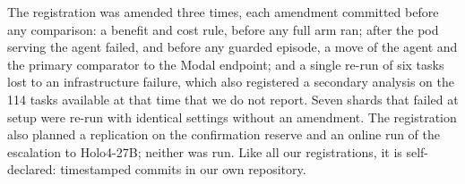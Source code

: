 The registration was amended three times, each amendment committed before any comparison: a benefit and cost rule, before any full arm ran; after the pod serving the agent failed, and before any guarded episode, a move of the agent and the primary comparator to the Modal endpoint; and a single re-run of six tasks lost to an infrastructure failure, which also registered a secondary analysis on the 114 tasks available at that time that we do not report. Seven shards that failed at setup were re-run with identical settings without an amendment. The registration also planned a replication on the confirmation reserve and an online run of the escalation to Holo4-27B; neither was run. Like all our registrations, it is self-declared: timestamped commits in our own repository. %

\begin{table}[t]
\centering\small
\resizebox{\linewidth}{!}{}
\caption{\textbf{About two thirds of the online fall in false ``done'' come from episodes in which the guard never ran.} The guarded run and the original served by the same Modal deployment, paired over the \OgN{} \textsc{test} tasks, split by what happened in the guarded episode. False ``done'': final \texttt{answer} on a task scored 0. B and C as registered (score below 1 to 1, and 1 to below 1). Last two columns: episodes that used all 50 steps.}
\label{tab:guard-online}
\end{table}

